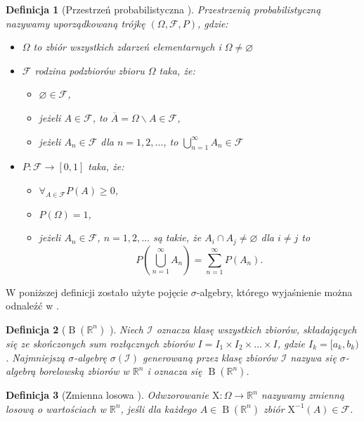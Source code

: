 \documentclass[12pt,a4paper]{report}
\newtheorem{df}{Definicja}[chapter]
\newcommand{\setR}{\mathbb{R}}
\newcommand{\sigmacialo}[1]{\operatorname{B}\left({#1} \right)}
\begin{document}
\begin{df}[Przestrzeń probabilistyczna {\citep[Sec 1.2, Sec 1.4]{wztp}}]
Przestrzenią probabilistyczną nazywamy uporządkowaną trójkę $(\Omega, \mathcal{F}, P)$, gdzie:
\begin{itemize}
\item $\Omega$ to zbiór wszystkich zdarzeń elementarnych i $\Omega \neq \varnothing$
\item $ \mathcal{F} $ rodzina podzbiorów zbioru $\Omega$ taka, że:
\begin{itemize}
\item $\varnothing \in \mathcal{F} $,
\item jeżeli $ \mathit{A} \in \mathcal{F}$, to $\overline{\mathit{A}} = \Omega \backslash \mathit{A} \in \mathcal{F}$,
\item jeżeli $ \mathit{A}_n \in \mathcal{F}$ dla $n=1,2,\ldots$, to $\bigcup_{n=1}^{\infty} \mathit{A}_n \in \mathcal{F}$
\end{itemize}
\item $P : \mathcal{F} \to [0,1]$ taka, że:
\begin{itemize}
\item $\forall_{\mathit{A} \in \mathcal{F}} P(\mathit{A}) \geq 0$,
\item $P(\Omega) = 1$,
\item jeżeli $ \mathit{A}_n \in \mathcal{F}$, $n=1,2,\ldots$ są takie, że $\mathit{A}_i \cap \mathit{A}_j \neq \varnothing$ dla $i \neq j$ to
$$
P(\bigcup_{n=1}^{\infty} \mathit{A}_n) = \sum_{n=1}^{\infty} P(\mathit{A}_n).
$$
\end{itemize}
\end{itemize}
\end{df}

W poniższej definicji zostało użyte pojęcie $\sigma$-algebry, którego wyjaśnienie można odnaleźć w {\citep[Sec 1.2 Def. 1.2]{wztp}}.

\begin{df}[$\sigmacialo{\setR^n}$ {\citep[Sec 1.12]{wztp}}]
Niech $\mathcal{I}$ oznacza klasę wszystkich zbiorów, składających się ze skończonych sum rozłącznych zbiorów $\mathit{I} = \mathit{I}_1 \times \mathit{I}_2 \times \ldots \times \mathit{I}$, gdzie $\mathit{I}_k = [a_k,b_k)$.
Najmniejszą $\sigma$-algebrę $\sigma(\mathcal{I})$ generowaną przez klasę zbiorów $\mathcal{I}$ nazywa się $\sigma$-algebrą borelowską zbiorów w $\setR^n$ i oznacza się $\sigmacialo{\setR^n}$.
\end{df}

\begin{df}[Zmienna losowa {\citep[Sec 5.1 Def. 1]{jakubowski}}]
Odwzorowanie $\mathrm{X}: \Omega \to \setR^n$ nazywamy zmienną losową o wartościach w $\setR^n$, jeśli dla każdego $\mathit{A} \in \sigmacialo{\setR^n}$ zbiór $\mathrm{X}^{-1}(\mathit{A}) \in \mathcal{F}$.
\end{df}
\end{document}
